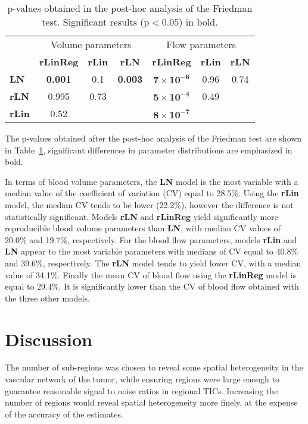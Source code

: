 \begin{table}
\begin{center}
\begin{tabular}{lcccccc}
\toprule
& \multicolumn{3}{c}{Volume parameters} & \multicolumn{3}{c}{Flow parameters} \\
\cmidrule(l){2-4} \cmidrule(l){5-7}
& \textbf{rLinReg} & \textbf{rLin} & \textbf{rLN} & \textbf{rLinReg} & \textbf{rLin} & \textbf{rLN} \\
\midrule
\textbf{LN} & \textbf{0.001} & 0.1 & \textbf{0.003} & $\mathbf{7 \times 10^{-6}}$ & 0.96 & 0.74 \\
\textbf{rLN} & 0.995 & 0.73 & & $\mathbf{5 \times 10^{-4}}$ & 0.49 \\
\textbf{rLin} & 0.52 & & & $\mathbf{8 \times 10^{-7}}$ \\
\bottomrule
\end{tabular}
\caption{p-values obtained in the post-hoc analysis of the Friedman test. Significant results ($\mathrm p < 0.05$) in bold.} 
\label{tab:pVal}
\end{center}
\end{table}

The p-values obtained after the post-hoc analysis of the Friedman test are shown in Table~\ref{tab:pVal}, significant differences in parameter distributions are emphasized in bold.

In terms of blood volume parameters, the \textbf{LN} model is the most variable with a median value of the coefficient of variation (CV) equal to 28.5\%. 
Using the \textbf{rLin} model, the median CV tends to be lower (22.2\%), however the difference is not statistically significant. 
Models \textbf{rLN} and \textbf{rLinReg} yield significantly more reproducible blood volume parameters than \textbf{LN}, with median CV values of 20.0\% and 19.7\%, respectively. 
For the blood flow parameters, models \textbf{rLin} and \textbf{LN} appear to the most variable parameters with medians of CV equal to 40.8\% and 39.6\%, respectively. 
The \textbf{rLN} model tends to yield lower CV, with a median value of 34.1\%.
Finally the mean CV of blood flow using the \textbf{rLinReg} model is equal to 29.4\%. It is significantly lower than the CV of blood flow obtained with the three other models.

\section{Discussion}
The number of sub-regions was chosen to reveal some spatial heterogeneity in the vascular network of the tumor, while ensuring regions were large enough to guarantee reasonable signal to noise ratios in regional TICs. 
Increasing the number of regions would reveal spatial heterogeneity more finely, at the expense of the accuracy of the estimates.

